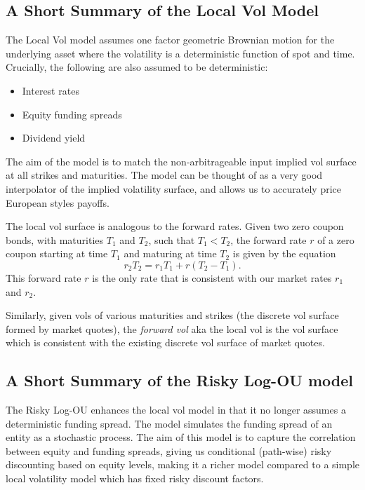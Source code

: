 \documentclass{amsart}
\theoremstyle{plain}
\numberwithin{equation}{section}
\begin{document}
\subsection{A Short Summary of the Local Vol Model}
The Local Vol model assumes one factor geometric Brownian motion for the underlying asset where the volatility is a deterministic function of spot and time. Crucially, the following are also assumed 
to be deterministic:
\begin{itemize}
	\item Interest rates
	\item Equity funding spreads
	\item Dividend yield 
\end{itemize}
The aim of the model is to match the non-arbitrageable input implied vol surface at all
strikes and maturities. The model can be thought of as a very good interpolator of the
implied volatility surface, and allows us to accurately price European styles payoffs.

The local vol surface is analogous to the forward rates. 
Given two zero coupon bonds, with maturities $T_1$ and $T_2$,
such that $T_1 < T_2$, the forward rate $r$ of a zero coupon starting
at time $T_1$ and maturing at time $T_2$ is given by the equation
$$ r_2 T_2 = r_1 T_1 + r (T_2 - T_1 ). $$ 
This forward rate $r$ is the only rate that is consistent 
with our market rates $r_1$ and $r_2$.

Similarly, given vols of various maturities and strikes 
(the discrete vol surface formed by market quotes),
the \emph{forward vol} aka the local vol is the vol surface 
which is consistent with the existing discrete vol surface of 
market quotes.


\subsection{A Short Summary of the Risky Log-OU model}
The Risky Log-OU enhances the local vol model in that it no longer assumes 
a deterministic funding spread. The model simulates the funding spread of an entity as a 
stochastic process. The aim of this model is to capture the correlation between 
equity and funding spreads, giving us conditional (path-wise) risky discounting 
based on equity levels, making it a richer model compared to a simple local 
volatility model which has fixed risky discount factors.
\end{document}
